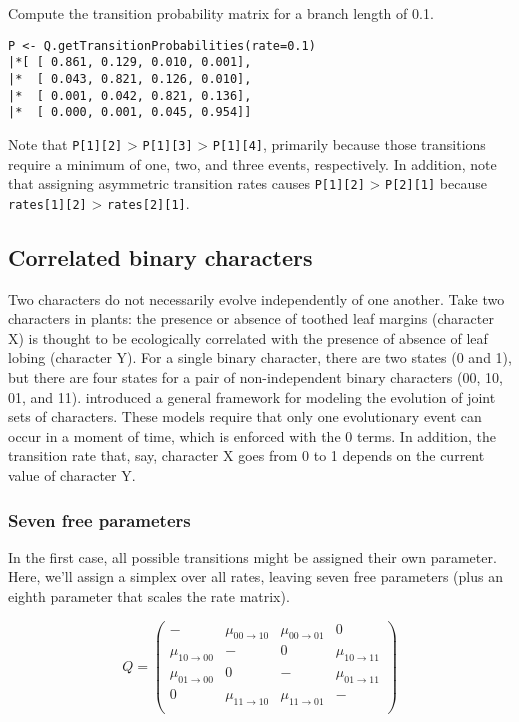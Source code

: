 Compute the transition probability matrix for a branch length of 0.1.

{\tt \begin{snugshade*}
\begin{lstlisting}
P <- Q.getTransitionProbabilities(rate=0.1)
|*[ [ 0.861, 0.129, 0.010, 0.001],
|*  [ 0.043, 0.821, 0.126, 0.010],
|*  [ 0.001, 0.042, 0.821, 0.136],
|*  [ 0.000, 0.001, 0.045, 0.954]]
\end{lstlisting}
\end{snugshade*}}

Note that {\tt P[1][2]} > {\tt P[1][3]} > {\tt P[1][4]}, primarily because those transitions require a minimum of one, two, and three events, respectively.
In addition, note that assigning asymmetric transition rates causes {\tt P[1][2]} > {\tt P[2][1]} because {\tt rates[1][2]} > {\tt rates[2][1]}.


\subsection{Correlated binary characters}

Two characters do not necessarily evolve independently of one another.
Take two characters in plants: the presence or absence of toothed leaf margins (character X) is thought to be ecologically correlated with the presence of absence of leaf lobing (character Y).
For a single binary character, there are two states (0 and 1), but there are four states for a pair of non-independent binary characters (00, 10, 01, and 11).
\citet{pagel04} introduced a general framework for modeling the evolution of joint sets of characters.
These models require that only one evolutionary event can occur in a moment of time, which is enforced with the 0 terms.
In addition, the transition rate that, say, character X goes from 0 to 1 depends on the current value of character Y.

\subsubsection{Seven free parameters}

In the first case, all possible transitions might be assigned their own parameter.
Here, we'll assign a simplex over all rates, leaving seven free parameters (plus an eighth parameter that scales the rate matrix).

\begin{equation*}
Q = \begin{pmatrix}
                      - & \mu_{00 \rightarrow 10} & \mu_{00 \rightarrow 01} &                       0 \\
\mu_{10 \rightarrow 00} &                       - &                       0 & \mu_{10 \rightarrow 11} \\
\mu_{01 \rightarrow 00} &                       0 &                       - & \mu_{01 \rightarrow 11} \\
                      0 & \mu_{11 \rightarrow 10} & \mu_{11 \rightarrow 01} &                       - \\
\end{pmatrix}
\end{equation*}

